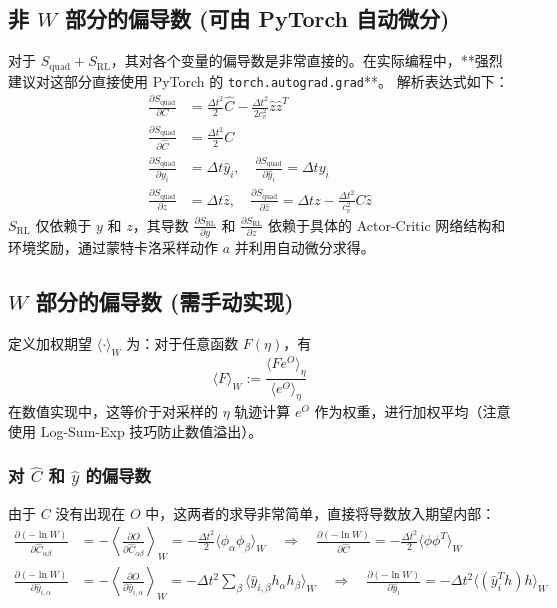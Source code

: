 \documentclass[UTF8]{ctexart}
\begin{document}
\subsection{非 $W$ 部分的偏导数 (可由 PyTorch 自动微分)}
对于 $S_{\text{quad}} + S_{\text{RL}}$，其对各个变量的偏导数是非常直接的。在实际编程中，**强烈建议对这部分直接使用 PyTorch 的 \texttt{torch.autograd.grad}**。
解析表达式如下：
\begin{align}
    \frac{\partial S_{\text{quad}}}{\partial C} &= \frac{\Delta t^2}{2} \hat{C} - \frac{\Delta t^2}{2 c_v^2} \hat{z} \hat{z}^T \\
    \frac{\partial S_{\text{quad}}}{\partial \hat{C}} &= \frac{\Delta t^2}{2} C \\
    \frac{\partial S_{\text{quad}}}{\partial y_i} &= \Delta t \hat{y}_i, \quad \frac{\partial S_{\text{quad}}}{\partial \hat{y}_i} = \Delta t y_i \\
    \frac{\partial S_{\text{quad}}}{\partial z} &= \Delta t \hat{z}, \quad \frac{\partial S_{\text{quad}}}{\partial \hat{z}} = \Delta t z - \frac{\Delta t^2}{c_v^2} C \hat{z}
\end{align}
$S_{\text{RL}}$ 仅依赖于 $y$ 和 $z$，其导数 $\frac{\partial S_{\text{RL}}}{\partial y}$ 和 $\frac{\partial S_{\text{RL}}}{\partial z}$ 依赖于具体的 Actor-Critic 网络结构和环境奖励，通过蒙特卡洛采样动作 $a$ 并利用自动微分求得。

\subsection{$W$ 部分的偏导数 (需手动实现)}
定义加权期望 $\langle \cdot \rangle_W$ 为：对于任意函数 $F(\eta)$，有
\begin{equation}
    \langle F \rangle_W := \frac{\langle F e^O \rangle_\eta}{\langle e^O \rangle_\eta}
\end{equation}
在数值实现中，这等价于对采样的 $\eta$ 轨迹计算 $e^O$ 作为权重，进行加权平均（注意使用 Log-Sum-Exp 技巧防止数值溢出）。

\subsubsection{对 $\hat{C}$ 和 $\hat{y}$ 的偏导数}
由于 $C$ 没有出现在 $O$ 中，这两者的求导非常简单，直接将导数放入期望内部：
\begin{align}
    \frac{\partial (-\ln W)}{\partial \hat{C}_{\alpha\beta}} &= - \left\langle \frac{\partial O}{\partial \hat{C}_{\alpha\beta}} \right\rangle_W = - \frac{\Delta t^2}{2} \langle \phi_\alpha \phi_\beta \rangle_W \quad \Rightarrow \quad \frac{\partial (-\ln W)}{\partial \hat{C}} = - \frac{\Delta t^2}{2} \langle \phi \phi^T \rangle_W \\
    \frac{\partial (-\ln W)}{\partial \hat{y}_{i,\alpha}} &= - \left\langle \frac{\partial O}{\partial \hat{y}_{i,\alpha}} \right\rangle_W = - \Delta t^2 \sum_{\beta} \langle \hat{y}_{i,\beta} h_\alpha h_\beta \rangle_W \quad \Rightarrow \quad \frac{\partial (-\ln W)}{\partial \hat{y}_i} = - \Delta t^2 \langle (\hat{y}_i^T h) h \rangle_W
\end{align}
\end{document}
